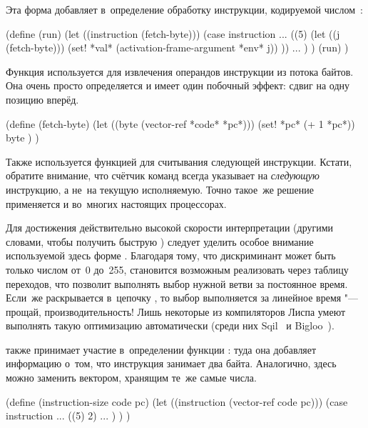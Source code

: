 Эта форма добавляет в~определение  обработку инструкции, кодируемой
числом~:

\begin{code:lisp}
(define (run)
  (let ((instruction (fetch-byte)))
    (case instruction
      ...
      ((5) (let ((j (fetch-byte)))
             (set! *val* (activation-frame-argument *env* j)) ))
      ... ) )
  (run) )
\end{code:lisp}

Функция  используется для извлечения операндов инструкции из
потока байтов. Она очень просто определяется и имеет один побочный эффект: сдвиг
 на одну позицию вперёд.

\begin{code:lisp}
(define (fetch-byte)
  (let ((byte (vector-ref *code* *pc*)))
    (set! *pc* (+ 1 *pc*))
    byte ) )
\end{code:lisp}

Также  используется функцией  для считывания следующей
инструкции. Кстати, обратите внимание, что счётчик команд всегда указывает на
\emph{следующую} инструкцию, а не~на текущую исполняемую. Точно такое~же решение
применяется и во~многих настоящих процессорах.

Для достижения действительно высокой скорости интерпретации (другими словами,
чтобы получить быструю ) следует уделить особое внимание используемой
здесь форме . Благодаря тому, что дискриминант  может быть
только числом от~0 до~255, становится возможным реализовать  через
таблицу переходов, что позволит выполнять выбор нужной ветви за постоянное
время. Если~же  раскрывается в~цепочку , то
выбор выполняется за линейное время "--- прощай, производительность! Лишь
некоторые из компиляторов Лиспа умеют выполнять такую оптимизацию автоматически
(среди них Sqil~\cite{sen91} и Bigloo~\cite{ser93}).

 также принимает участие в~определении функции
: туда она добавляет информацию о~том, что инструкция
 занимает два байта. Аналогично, здесь  можно
заменить вектором, хранящим те~же самые числа.

\begin{code:lisp}
(define (instruction-size code pc)
  (let ((instruction (vector-ref code pc)))
    (case instruction
      ...
      ((5) 2)
      ... ) ) )
\end{code:lisp}

